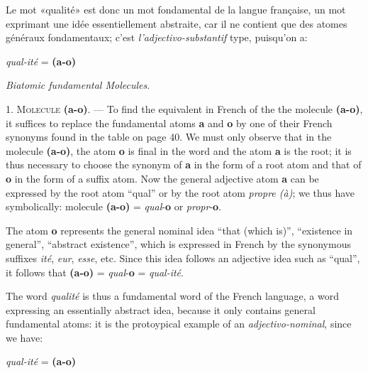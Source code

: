 \begin{sloppypar}
{    Le mot «qualité» est donc un mot fondamental de la langue
    française, un mot exprimant une idée essentiellement abstraite,
    car il ne contient que des atomes généraux fondamentaux; c’est
    \emph{l'adjectivo-substantif} type, puisqu’on a:

    \begin{center}
      \emph{qual-ité} = \textbf{(a-o)}
    \end{center}
  }%
  {\begin{center} \emph{Biatomic fundamental Molecules}.
    \end{center}


    1. \textsc{Molecule} \textbf{(a-o)}. — To find the equivalent in
    French of the the molecule \textbf{(a-o)}, it suffices to replace
    the fundamental atoms \textbf{a} and \textbf{o} by one of their
    French synonyms found in the table on page 40.  We must only
    observe that in the molecule \textbf{(a-o)}, the atom \textbf{o}
    is final in the word and the atom \textbf{a} is the root; it is
    thus necessary to choose the synonym of \textbf{a} in the form of
    a root atom and that of \textbf{o} in the form of a suffix
    atom. Now the general adjective atom \textbf{a} can be expressed
    by the root atom ``qual'' or by the root atom \emph{propre (à)}; we
    thus have symbolically: molecule \textbf{(a-o)} =
    \emph{qual}-\textbf{o} or \emph{propr}-\textbf{o}.

    The atom \textbf{o} represents the general nominal idea ``that
    (which is)'', ``existence in general'', ``abstract existence'',
    which is expressed in French by the synonymous suffixes \emph{ité},
    \emph{eur}, \emph{esse}, etc. Since this idea follows an adjective idea
    such as ``qual'', it follows that \textbf{(a-o)} =
    \emph{qual}-\textbf{o} = \emph{qual-ité}.

    The word \emph{qualité} is thus a fundamental word of the French
    language, a word expressing an essentially abstract idea, because
    it only contains general fundamental atoms: it is the protoypical
    example of an \emph{adjectivo-nominal}, since we have:
    
    \begin{center}
      \emph{qual-ité} = \textbf{(a-o)}
    \end{center}
  }

\end{sloppypar}
